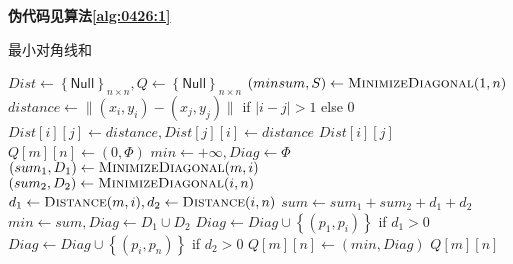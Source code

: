 \begin{questions}
\begin{parts}
\begin{solution}
            \textbf{伪代码见算法\ref{alg:0426:1}}
        \end{solution}

        \begin{algorithm}[!htp]
            \caption{最小对角线和}\label{alg:0426:1}
            \begin{algorithmic}[1]
                \State $Dist \gets \left\{ \mathsf{Null} \right\}_{n \times n}, Q \gets \left\{ \mathsf{Null} \right\}_{n \times n}$
                \State $(minsum, S) \gets \Call{MinimizeDiagonal}{1,n}$
                \Statex
                \State $distance \gets \| (x_i,y_i) - (x_j,y_j) \|$ if $|i-j| > 1$ else $0$
                \State $Dist[i][j] \gets distance, Dist[j][i] \gets distance$
                \EndIf
                \State \Return $Dist[i][j]$
                \EndProcedure
                \Statex
                \Statex {}
                \State $Q[m][n] \gets (0, \Phi)$
                \Else
                \State $min \gets +\infty, Diag \gets \Phi$
                \State $(sum_1, D_1) \gets \Call{MinimizeDiagonal}{m,i}$
                \State $(sum_2, D_2) \gets \Call{MinimizeDiagonal}{i,n}$
                \State $d_1 \gets \Call{Distance}{m,i}, d_2 \gets \Call{Distance}{i,n}$
                \State $sum \gets sum_1 + sum_2 + d_1 + d_2$
                \State $min \gets sum , Diag \gets D_1 \cup D_2$
                \State $Diag \gets Diag \cup \left\{(p_1, p_i) \right\}$ if $d_1 > 0$
                \State $Diag \gets Diag \cup \left\{(p_i, p_n) \right\}$ if $d_2 > 0$
                \EndIf
                \EndFor
                \State $Q[m][n] \gets (min, Diag)$
                \EndIf
                \EndIf
                \State \Return $Q[m][n]$
                \EndProcedure
            \end{algorithmic}
        \end{algorithm}
    \end{parts}


\end{questions}
